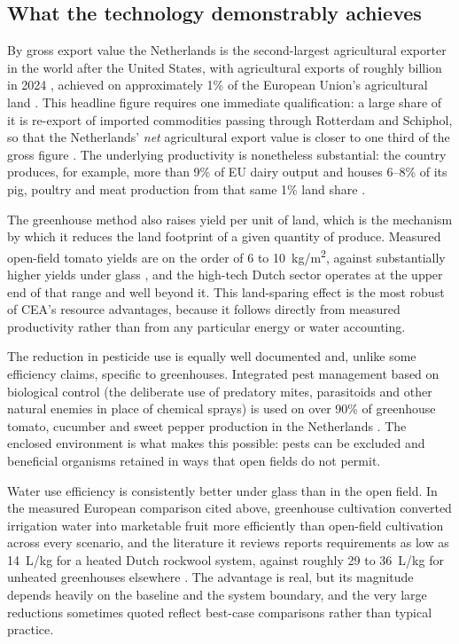 \subsection{What the technology demonstrably achieves}

By gross export value the Netherlands is the second-largest agricultural exporter in the world after the United States, with agricultural exports of roughly  billion in 2024 \cite{cbs2025exports}, achieved on approximately 1\% of the European Union's agricultural land \cite[p.~2]{vangrinsven2019dutch}. This headline figure requires one immediate qualification: a large share of it is re-export of imported commodities passing through Rotterdam and Schiphol, so that the Netherlands' \emph{net} agricultural export value is closer to one third of the gross figure \cite[p.~2]{vangrinsven2019dutch}. The underlying productivity is nonetheless substantial: the country produces, for example, more than 9\% of EU dairy output and houses 6--8\% of its pig, poultry and meat production from that same 1\% land share \cite[p.~2]{vangrinsven2019dutch}.

The greenhouse method also raises yield per unit of land, which is the mechanism by which it reduces the land footprint of a given quantity of produce. Measured open-field tomato yields are on the order of 6 to 10~kg/m\textsuperscript{2}, against substantially higher yields under glass \cite[p.~16]{ntinas2017tomato}, and the high-tech Dutch sector operates at the upper end of that range and well beyond it. This land-sparing effect is the most robust of CEA's resource advantages, because it follows directly from measured productivity rather than from any particular energy or water accounting.

The reduction in pesticide use is equally well documented and, unlike some efficiency claims, specific to greenhouses. Integrated pest management based on biological control (the deliberate use of predatory mites, parasitoids and other natural enemies in place of chemical sprays) is used on over 90\% of greenhouse tomato, cucumber and sweet pepper production in the Netherlands \cite[p.~1992]{chandler2011biopesticides}. The enclosed environment is what makes this possible: pests can be excluded and beneficial organisms retained in ways that open fields do not permit.

Water use efficiency is consistently better under glass than in the open field. In the measured European comparison cited above, greenhouse cultivation converted irrigation water into marketable fruit more efficiently than open-field cultivation across every scenario, and the literature it reviews reports requirements as low as 14~L/kg for a heated Dutch rockwool system, against roughly 29 to 36~L/kg for unheated greenhouses elsewhere \cite[p.~16]{ntinas2017tomato}. The advantage is real, but its magnitude depends heavily on the baseline and the system boundary, and the very large reductions sometimes quoted reflect best-case comparisons rather than typical practice.

